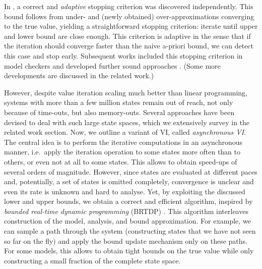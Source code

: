 \documentclass{theoretics}
\begin{document}
In \cite{DBLP:conf/rp/HaddadM14,DBLP:conf/atva/BrazdilCCFKKPU14}, a correct and \emph{adaptive} stopping criterion was discovered independently.
This bound follows from under- and (newly obtained) over-approximations converging to the true value, yielding a straightforward stopping criterion: iterate until upper and lower bound are close enough.
This criterion is adaptive in the sense that if the iteration should converge faster than the naive a-priori bound, we can detect this case and stop early.
Subsequent works included this stopping criterion in model checkers \cite{DBLP:conf/cav/Baier0L0W17} and developed further sound approaches \cite{DBLP:conf/cav/QuatmannK18,DBLP:conf/cav/HartmannsK20}.
(Some more developments are discussed in the related work.)

However, despite value iteration scaling much better than linear programming, systems with more than a few million states remain out of reach, not only because of time-outs, but also memory-outs.
Several approaches have been devised to deal with such large state spaces, which we extensively survey in the related work section.
Now, we outline a variant of VI, called \emph{asynchronous VI}.
The central idea is to perform the iterative computations in an asynchronous manner, i.e.\ apply the iteration operation to some states more often than to others, or even not at all to some states.
This allows to obtain speed-ups of several orders of magnitude.
However, since states are evaluated at different paces and, potentially, a set of states is omitted completely, convergence is unclear and even its rate is unknown and hard to analyse.
Yet, by exploiting the discussed lower and upper bounds, we obtain a correct and efficient algorithm, inspired by \emph{bounded real-time dynamic programming} (BRTDP) \cite{DBLP:conf/icml/McMahanLG05}.
This algorithm interleaves construction of the model, analysis, and bound approximation.
For example, we can sample a path through the system (constructing states that we have not seen so far on the fly) and apply the bound update mechanism only on these paths.
For some models, this allows to obtain tight bounds on the true value while only constructing a small fraction of the complete state space.
\end{document}
